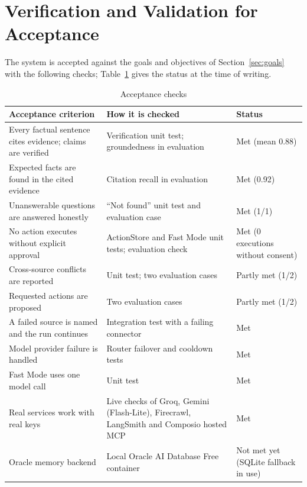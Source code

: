 \documentclass[oneside,a4paper,12pt]{report}
\begin{document}
  \section{Verification and Validation for Acceptance}
The system is accepted against the goals and objectives of Section~\ref{sec:goals} with the following checks; Table~\ref{tab:acceptance} gives the status at the time of writing.

\begin{table}[!htbp]
\begin{center}
\def\arraystretch{1.25}
\small
\begin{tabularx}{\textwidth}{| X | p{4.2cm} | p{2.6cm} |}
\hline
Acceptance criterion & How it is checked & Status \\ \hline
Every factual sentence cites evidence; claims are verified & Verification unit test; groundedness in evaluation & Met (mean 0.88) \\ \hline
Expected facts are found in the cited evidence & Citation recall in evaluation & Met (0.92) \\ \hline
Unanswerable questions are answered honestly & ``Not found'' unit test and evaluation case & Met (1/1) \\ \hline
No action executes without explicit approval & ActionStore and Fast Mode unit tests; evaluation check & Met (0 executions without consent) \\ \hline
Cross-source conflicts are reported & Unit test; two evaluation cases & Partly met (1/2) \\ \hline
Requested actions are proposed & Two evaluation cases & Partly met (1/2) \\ \hline
A failed source is named and the run continues & Integration test with a failing connector & Met \\ \hline
Model provider failure is handled & Router failover and cooldown tests & Met \\ \hline
Fast Mode uses one model call & Unit test & Met \\ \hline
Real services work with real keys & Live checks of Groq, Gemini (Flash-Lite), Firecrawl, LangSmith and Composio hosted MCP & Met \\ \hline
Oracle memory backend & Local Oracle AI Database Free container & Not met yet (SQLite fallback in use) \\ \hline
\end{tabularx}
\end{center}
\caption{Acceptance checks}
\label{tab:acceptance}
\end{table}
\end{document}
